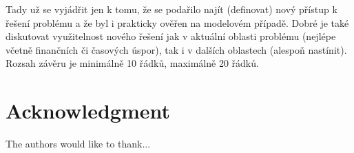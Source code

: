 \documentclass[conference]{IEEEtran}
\begin{document}
Tady už se vyjádřit jen k tomu, že se podařilo najít (definovat) nový přístup k řešení problému a že byl i prakticky ověřen na modelovém případě. 
Dobré je také diskutovat využitelnost nového řešení jak v aktuální oblasti problému (nejlépe včetně finančních či časových úspor), tak i v dalších oblastech (alespoň nastínit).
Rozsah závěru je minimálně 10 řádků, maximálně 20 řádků.







\section*{Acknowledgment}


The authors would like to thank...







%
%
%




\end{document}
